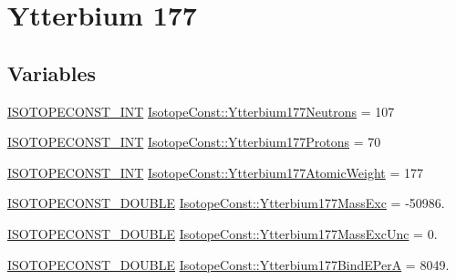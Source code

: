 \hypertarget{group___isotope_const-_ytterbium-_yb177}{}\section{Ytterbium 177}
\label{group___isotope_const-_ytterbium-_yb177}
\subsection*{Variables}
\begin{DoxyCompactItemize}
\item 
\mbox{\hyperlink{group___isotope_const-_macros_ga5f18360b3e99483a35c32d789e62621c}{I\+S\+O\+T\+O\+P\+E\+C\+O\+N\+S\+T\+\_\+\+I\+NT}} \mbox{\hyperlink{group___isotope_const-_ytterbium-_yb177_ga5d1461bc3473c8331d6e579e5a634025}{Isotope\+Const\+::\+Ytterbium177\+Neutrons}} = 107
\item 
\mbox{\hyperlink{group___isotope_const-_macros_ga5f18360b3e99483a35c32d789e62621c}{I\+S\+O\+T\+O\+P\+E\+C\+O\+N\+S\+T\+\_\+\+I\+NT}} \mbox{\hyperlink{group___isotope_const-_ytterbium-_yb177_gadb19478725fdc79369588818f214f22e}{Isotope\+Const\+::\+Ytterbium177\+Protons}} = 70
\item 
\mbox{\hyperlink{group___isotope_const-_macros_ga5f18360b3e99483a35c32d789e62621c}{I\+S\+O\+T\+O\+P\+E\+C\+O\+N\+S\+T\+\_\+\+I\+NT}} \mbox{\hyperlink{group___isotope_const-_ytterbium-_yb177_ga602a5d70836e07bf1a1db8275c55d66c}{Isotope\+Const\+::\+Ytterbium177\+Atomic\+Weight}} = 177
\item 
\mbox{\hyperlink{group___isotope_const-_macros_ga8f45a7272ce02c0b4c65c44636ed719a}{I\+S\+O\+T\+O\+P\+E\+C\+O\+N\+S\+T\+\_\+\+D\+O\+U\+B\+LE}} \mbox{\hyperlink{group___isotope_const-_ytterbium-_yb177_ga6a1136306d6475c893e20b23e90b9ba8}{Isotope\+Const\+::\+Ytterbium177\+Mass\+Exc}} = -\/50986.
\item 
\mbox{\hyperlink{group___isotope_const-_macros_ga8f45a7272ce02c0b4c65c44636ed719a}{I\+S\+O\+T\+O\+P\+E\+C\+O\+N\+S\+T\+\_\+\+D\+O\+U\+B\+LE}} \mbox{\hyperlink{group___isotope_const-_ytterbium-_yb177_gaed6ceb0d0d1f862b0f3e260b2764f9fb}{Isotope\+Const\+::\+Ytterbium177\+Mass\+Exc\+Unc}} = 0.
\item 
\mbox{\hyperlink{group___isotope_const-_macros_ga8f45a7272ce02c0b4c65c44636ed719a}{I\+S\+O\+T\+O\+P\+E\+C\+O\+N\+S\+T\+\_\+\+D\+O\+U\+B\+LE}} \mbox{\hyperlink{group___isotope_const-_ytterbium-_yb177_ga7feff02d593adcedb3d29124133e0d70}{Isotope\+Const\+::\+Ytterbium177\+Bind\+E\+PerA}} = 8049.
\item 

\end{DoxyCompactItemize}
